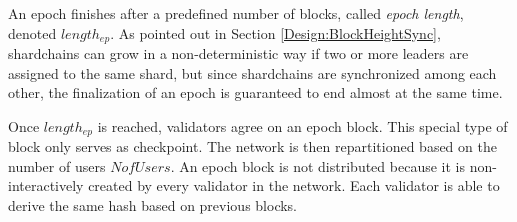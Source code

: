 An epoch finishes after a predefined number of blocks, called \textit{epoch length}, denoted $length_{ep}$. As pointed out in Section \ref{Design:BlockHeightSync}, shardchains can grow in a non-deterministic way if two or more leaders are assigned to the same shard, but since shardchains are synchronized among each other, the finalization of an epoch is guaranteed to end almost at the same time.

Once $length_{ep}$ is reached, validators agree on an epoch block. This special type of block only serves as checkpoint. The network is then repartitioned based on the number of users $NofUsers$. An epoch block is not distributed because it is non-interactively created by every validator in the network. Each validator is able to derive the same hash based on previous blocks.


